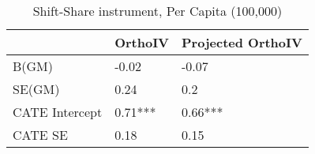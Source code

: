 \begin{table}\centering\caption{Shift-Share instrument, Per Capita (100,000)}\begin{tabular}{lll}
\toprule
                & OrthoIV   & Projected OrthoIV   \\
\midrule
 B(GM)          & -0.02     & -0.07               \\
 SE(GM)         & 0.24      & 0.2                 \\
 CATE Intercept & 0.71***   & 0.66***             \\
 CATE SE        & 0.18      & 0.15                \\
\bottomrule
\end{tabular}\end{table}